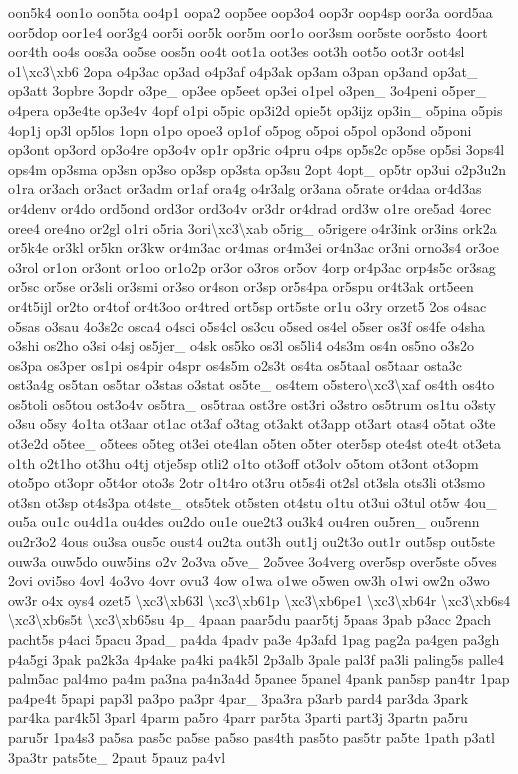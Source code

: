 \begin{DoxyCompactItemize}
oon5k4 oon1o oon5ta oo4p1 oopa2 oop5ee oop3o4 oop3r oop4sp oor3a oord5aa oor5dop oor1e4 oor3g4 oor5i oor5k oor5m oor1o oor3sm oor5ste oor5sto 4oort oor4th oo4s oos3a oo5se oos5n oo4t oot1a oot3es oot3h oot5o oot3r oot4sl o1\textbackslash{}xc3\textbackslash{}xb6 2opa o4p3ac op3ad o4p3af o4p3ak op3am o3pan op3and op3at\-\_\- op3att 3opbre 3opdr o3pe\-\_\- op3ee op5eet op3ei o1pel o3pen\-\_\- 3o4peni o5per\-\_\- o4pera op3e4te op3e4v 4opf o1pi o5pic op3i2d opie5t op3ijz op3in\-\_\- o5pina o5pis 4op1j op3l op5los 1opn o1po opoe3 op1of o5pog o5poi o5pol op3ond o5poni op3ont op3ord op3o4re op3o4v op1r op3ric o4pru o4ps op5s2c op5se op5si 3ops4l ops4m op3sma op3sn op3so op3sp op3sta op3su 2opt 4opt\-\_\- op5tr op3ui o2p3u2n o1ra or3ach or3act or3adm or1af ora4g o4r3alg or3ana o5rate or4daa or4d3as or4denv or4do ord5ond ord3or ord3o4v or3dr or4drad ord3w o1re ore5ad 4orec oree4 ore4no or2gl o1ri o5ria 3ori\textbackslash{}xc3\textbackslash{}xab o5rig\-\_\- o5rigere o4r3ink or3ins ork2a or5k4e or3kl or5kn or3kw or4m3ac or4mas or4m3ei or4n3ac or3ni orno3s4 or3oe o3rol or1on or3ont or1oo or1o2p or3or o3ros or5ov 4orp or4p3ac orp4s5c or3sag or5sc or5se or3sli or3smi or3so or4son or3sp or5s4pa or5spu or4t3ak ort5een or4t5ijl or2to or4tof or4t3oo or4tred ort5sp ort5ste or1u o3ry orzet5 2os o4sac o5sas o3sau 4o3s2c osca4 o4sci o5s4cl os3cu o5sed os4el o5ser os3f os4fe o4sha o3shi os2ho o3si o4sj os5jer\-\_\- o4sk os5ko os3l os5li4 o4s3m os4n os5no o3s2o os3pa os3per os1pi os4pir o4spr os4s5m o2s3t os4ta os5taal os5taar osta3c ost3a4g os5tan os5tar o3stas o3stat os5te\-\_\- os4tem o5stero\textbackslash{}xc3\textbackslash{}xaf os4th os4to os5toli os5tou ost3o4v os5tra\-\_\- os5traa ost3re ost3ri o3stro os5trum os1tu o3sty o3su o5sy 4o1ta ot3aar ot1ac ot3af o3tag ot3akt ot3app ot3art otas4 o5tat o3te ot3e2d o5tee\-\_\- o5tees o5teg ot3ei ote4lan o5ten o5ter oter5sp ote4st ote4t ot3eta o1th o2t1ho ot3hu o4tj otje5sp otli2 o1to ot3off ot3olv o5tom ot3ont ot3opm oto5po ot3opr o5t4or oto3s 2otr o1t4ro ot3ru ot5s4i ot2sl ot3sla ots3li ot3smo ot3sn ot3sp ot4s3pa ot4ste\-\_\- ots5tek ot5sten ot4stu o1tu ot3ui o3tul ot5w 4ou\-\_\- ou5a ou1c ou4d1a ou4des ou2do ou1e oue2t3 ou3k4 ou4ren ou5ren\-\_\- ou5renn ou2r3o2 4ous ou3sa ous5c oust4 ou2ta out3h out1j ou2t3o out1r out5sp out5ste ouw3a ouw5do ouw5ins o2v 2o3va o5ve\-\_\- 2o5vee 3o4verg over5sp over5ste o5ves 2ovi ovi5so 4ovl 4o3vo 4ovr ovu3 4ow o1wa o1we o5wen ow3h o1wi ow2n o3wo ow3r o4x oys4 ozet5 \textbackslash{}xc3\textbackslash{}xb63l \textbackslash{}xc3\textbackslash{}xb61p \textbackslash{}xc3\textbackslash{}xb6pe1 \textbackslash{}xc3\textbackslash{}xb64r \textbackslash{}xc3\textbackslash{}xb6s4 \textbackslash{}xc3\textbackslash{}xb6s5t \textbackslash{}xc3\textbackslash{}xb65su 4p\-\_\- 4paan paar5du paar5tj 5paas 3pab p3acc 2pach pacht5s p4aci 5pacu 3pad\-\_\- pa4da 4padv pa3e 4p3afd 1pag pag2a pa4gen pa3gh p4a5gi 3pak pa2k3a 4p4ake pa4ki pa4k5l 2p3alb 3pale pal3f pa3li paling5s palle4 palm5ac pal4mo pa4m pa3na pa4n3a4d 5panee 5panel 4pank pan5sp pan4tr 1pap pa4pe4t 5papi pap3l pa3po pa3pr 4par\-\_\- 3pa3ra p3arb pard4 par3da 3park par4ka par4k5l 3parl 4parm pa5ro 4parr par5ta 3parti part3j 3partn pa5ru paru5r 1pa4s3 pa5sa pas5c pa5se pa5so pas4th pas5to pas5tr pa5te 1path p3atl 3pa3tr pats5te\-\_\- 2paut 5pauz pa4vl 
\end{DoxyCompactItemize}
